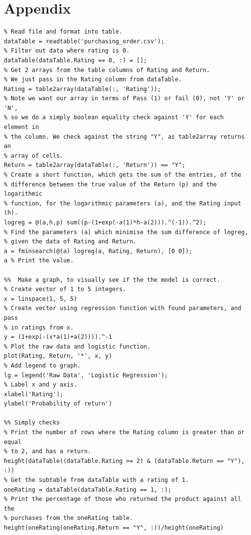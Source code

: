 \documentclass[12pt]{article}
\begin{document}
\section*{Appendix}
\begin{lstlisting}[caption={Question 1 full code},label={1_fullCode}]
%% Optimise the logreg function to find the parameters values
% Read file and format into table.
dataTable = readtable('purchasing_order.csv');
% Filter out data where rating is 0.
dataTable(dataTable.Rating == 0, :) = [];
% Get 2 arrays from the table columns of Rating and Return.
% We just pass in the Rating column from dataTable.
Rating = table2array(dataTable(:, 'Rating'));
% Note we want our array in terms of Pass (1) or fail (0), not 'Y' or 'N',
% so we do a simply boolean equality check against 'Y' for each element in
% the column. We check against the string "Y", as table2array returns an
% array of cells.
Return = table2array(dataTable(:, 'Return')) == "Y";
% Create a short function, which gets the sum of the entries, of the
% difference between the true value of the Return (p) and the logarithmic
% function, for the logarithmic parameters (a), and the Rating input (h).
logreg = @(a,h,p) sum((p-(1+exp(-a(1)*h-a(2))).^(-1)).^2);
% Find the parameters (a) which minimise the sum difference of logreg,
% given the data of Rating and Return.
a = fminsearch(@(a) logreg(a, Rating, Return), [0 0]);
a % Print the value.

%%  Make a graph, to visually see if the the model is correct.
% Create vector of 1 to 5 integers.
x = linspace(1, 5, 5)
% Create vector using regression function with found parameters, and pass
% in ratings from x.
y = (1+exp(-(x*a(1)+a(2)))).^-1
% Plot the raw data and logistic function.
plot(Rating, Return, '*', x, y)
% Add legend to graph.
lg = legend('Raw Data', 'Logistic Regression');
% Label x and y axis.
xlabel('Rating');
ylabel('Probability of return')

%% Simply checks
% Print the number of rows where the Rating column is greater than or equal
% to 2, and has a return.
height(dataTable((dataTable.Rating >= 2) & (dataTable.Return == "Y"), :))
% Get the subtable from dataTable with a rating of 1.
oneRating = dataTable(dataTable.Rating == 1, :);
% Print the percentage of those who returned the product against all the
% purchases from the oneRating table.
height(oneRating(oneRating.Return == "Y", :))/height(oneRating)
\end{lstlisting}
\end{document}
